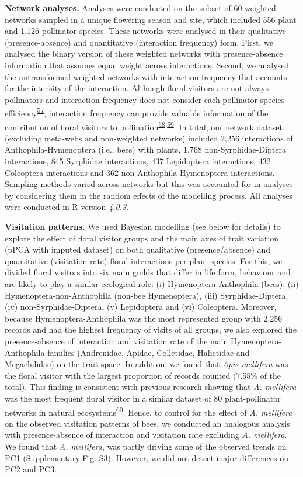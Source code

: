 \documentclass[12pt,a4paper,]{article}
\begin{document}
\textbf{Network analyses.} Analyses were conducted on the subset of 60
weighted networks sampled in a unique flowering season and site, which
included 556 plant and 1,126 pollinator species. These networks were
analysed in their qualitative (presence-absence) and quantitative
(interaction frequency) form. First, we analysed the binary version of
these weighted networks with presence-absence information that assumes
equal weight across interactions. Second, we analysed the untransformed
weighted networks with interaction frequency that accounts for the
intensity of the interaction. Although floral visitors are not always
pollinators and interaction frequency does not consider each pollinator
species
efficiency\textsuperscript{\protect\hyperlink{ref-ballantyne2015}{57}},
interaction frequency can provide valuable information of the
contribution of floral visitors to
pollination\textsuperscript{\protect\hyperlink{ref-vazquez2005}{58},\protect\hyperlink{ref-vazquez2012}{59}}.
In total, our network dataset (excluding meta-webs and non-weighted
networks) included 2,256 interactions of Anthophila-Hymenoptera (i.e.,
bees) with plants, 1,768 non-Syrphidae-Diptera interactions, 845
Syrphidae interactions, 437 Lepidoptera interactions, 432 Coleoptera
interactions and 362 non-Anthophila-Hymenoptera interactions. Sampling
methods varied across networks but this was accounted for in analyses by
considering them in the random effects of the modelling process. All
analyses were conducted in R version \emph{4.0.3}.

\textbf{Visitation patterns.} We used Bayesian modelling (see below for
details) to explore the effect of floral visitor groups and the main
axes of trait variation (pPCA with imputed dataset) on both qualitative
(presence/absence) and quantitative (visitation rate) floral
interactions per plant species. For this, we divided floral visitors
into six main guilds that differ in life form, behaviour and are likely
to play a similar ecological role: (i) Hymenoptera-Anthophila (bees),
(ii) Hymenoptera-non-Anthophila (non-bee Hymenoptera), (iii)
Syrphidae-Diptera, (iv) non-Syrphidae-Diptera, (v) Lepidoptera and (vi)
Coleoptera. Moreover, because Hymenoptera-Anthophila was the most
represented group with 2,256 records and had the highest frequency of
visits of all groups, we also explored the presence-absence of
interaction and visitation rate of the main Hymenoptera-Anthophila
families (Andrenidae, Apidae, Colletidae, Halictidae and Megachilidae)
on the trait space. In addition, we found that \emph{Apis mellifera} was
the floral visitor with the largest proportion of records counted
(7.55\% of the total). This finding is consistent with previous research
showing that \emph{A. mellifera} was the most frequent floral visitor in
a similar dataset of 80 plant-pollinator networks in natural
ecosystems\textsuperscript{\protect\hyperlink{ref-hung2018}{60}}. Hence,
to control for the effect of \emph{A. mellifera} on the observed
visitation patterns of bees, we conducted an analogous analysis with
presence-absence of interaction and visitation rate excluding \emph{A.
mellifera}. We found that \emph{A. mellifera}, was partly driving some
of the observed trends on PC1 (Supplementary Fig. S3). However, we did
not detect major differences on PC2 and PC3.
\end{document}
